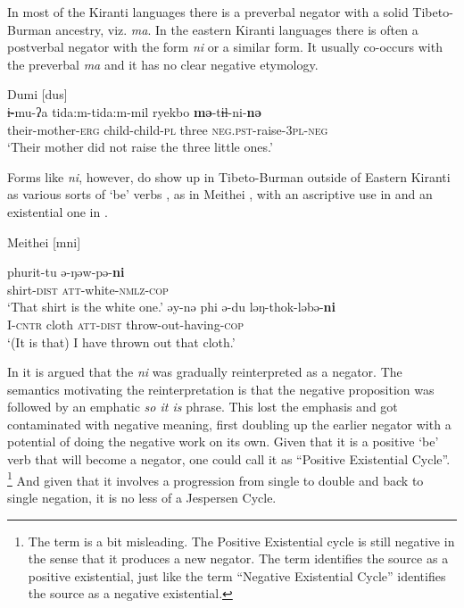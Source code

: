 ﻿\documentclass[output=paper]{langsci/langscibook}
\begin{document}
In most of the Kiranti languages there is a preverbal negator with a solid
Tibeto-Burman ancestry, viz. \textit{ma}. In the eastern Kiranti languages
there is often a postverbal negator with the form \textit{ni} or a similar
form. It usually co-occurs with the preverbal \textit{ma} and it has no
clear negative etymology.
%
\begin{exe}\ex\label{ex:int-dumi-mother}
Dumi [dus] \\
    \gll i̶-mu-ʔa  tida:m-tida:m-mil  ryekbo
    \textbf{mə}-ti̶̶l-ni-\textbf{nə} \\
      their-mother-\textsc{erg}  child-child-\textsc{pl}  three 
    \textsc{neg.pst}-raise-\textsc{3pl-neg} \\
    \glt `Their mother did not raise the three little ones.'
    \end{exe}
%
Forms like \textit{ni}, however, do show up in Tibeto-Burman outside of
Eastern Kiranti as various sorts of `be' verbs \parencite{Lowes2006}, as in
Meithei \parencite[249--250, 297]{Chelliah1997}, with an ascriptive use in
 and an existential one in
.%

\begin{exe}\ex Meithei [mni]
\begin{xlist}
    \ex\label{ex:int-meithei-shirt}
    \gll phurit-tu  ə-ŋəw-pə-\textbf{ni} \\
    shirt-\textsc{dist}  \textsc{att}-white-\textsc{nmlz-cop}\\
    \glt `That shirt is the white one.'
    \ex\label{ex:int-meithei-cloth}
    \gll əy-nə    phi  ə-du    ləŋ-thok-ləbə-\textbf{ni}\\
I-\textsc{cntr}  cloth  \textsc{att-dist}  throw-out-having-\textsc{cop}\\
    \glt `(It is that) I have thrown out that cloth.'
    \end{xlist}\end{exe}
%
In \textcite{AuweraVossen2017} it is argued that the \textit{ni} was
gradually reinterpreted as a negator. The semantics motivating the
reinterpretation is that the negative proposition was followed by an
emphatic \textit{so it is} phrase. This lost the emphasis
and got contaminated with negative meaning, first doubling up the earlier
negator with a potential of doing the negative work on its own. Given that
it is a positive `be' verb that will become a negator, one could call it as
``Positive Existential Cycle''.%
%
\footnote{The term is a bit misleading. The Positive Existential cycle is
still negative in the sense that it produces a new negator. The term
identifies the source as a positive existential, just like the term
``Negative Existential Cycle'' identifies the source as a negative
existential.} %
%
And given that it involves a progression from single to double and back to
single negation, it is no less of a Jespersen Cycle.
\end{document}
